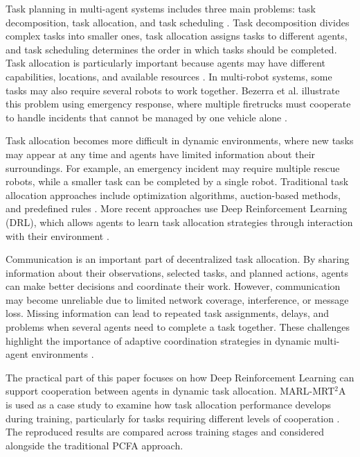 \documentclass[conference]{IEEEtran}
\begin{document}
Task planning in multi-agent systems includes three main problems: task decomposition, task allocation, and task
scheduling \cite{tao2026survey}. Task decomposition divides complex tasks into smaller ones, task allocation assigns
tasks to different agents, and task scheduling determines the order in which tasks should be completed. Task allocation
is particularly important because agents may have different capabilities, locations, and available resources \cite{tao2026survey}.
In multi-robot systems, some tasks may also require several robots to work together. Bezerra et al. illustrate this
problem using emergency response, where multiple firetrucks must cooperate to handle incidents that cannot be managed
by one vehicle alone \cite{bezerra2025coalition}.

Task allocation becomes more difficult in dynamic environments, where new tasks may appear at any time and agents have
limited information about their surroundings. For example, an emergency incident may require multiple rescue robots,
while a smaller task can be completed by a single robot. Traditional task allocation approaches include optimization
algorithms, auction-based methods, and predefined rules \cite{tao2026survey}. More recent approaches use Deep
Reinforcement Learning (DRL), which allows agents to learn task allocation strategies through interaction with their
environment \cite{dai2025heterogeneous,bezerra2025coalition}.

Communication is an important part of decentralized task allocation. By sharing information about their observations,
selected tasks, and planned actions, agents can make better decisions and coordinate their work. However, communication
may become unreliable due to limited network coverage, interference, or message loss. Missing information can lead to
repeated task assignments, delays, and problems when several agents need to complete a task together. These
challenges highlight the importance of adaptive coordination strategies in dynamic multi-agent environments \cite{verma2025communication,yang2025priors}.

The practical part of this paper focuses on how Deep Reinforcement Learning can support cooperation between agents in
dynamic task allocation. MARL-MRT$^2$A is used as a case study to examine how task allocation performance develops during
training, particularly for tasks requiring different levels of cooperation \cite{bezerra2025coalition}. The reproduced
results are compared across training stages and considered alongside the traditional PCFA approach.
\end{document}
